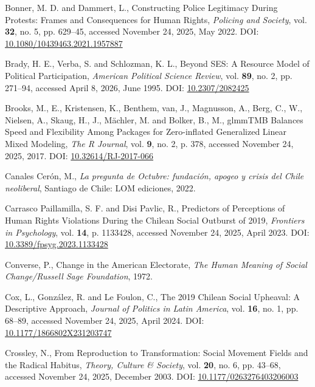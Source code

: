 \documentclass[
  13pt,
]{article}
\newlength{\cslhangindent}
\newenvironment{CSLReferences}[2] %
 {\begin{list}{}{%
  \setlength{\itemindent}{0pt}
  \setlength{\leftmargin}{0pt}
  \setlength{\parsep}{0pt}
  \ifodd #1
   \setlength{\leftmargin}{\cslhangindent}
   \setlength{\itemindent}{-1\cslhangindent}
  \fi
  \setlength{\itemsep}{#2\baselineskip}}}
 {\end{list}}
\begin{document}
\begin{CSLReferences}{1}{0}
Bonner, M. D. and Dammert, L., Constructing Police Legitimacy During
Protests: Frames and Consequences for Human Rights, \emph{Policing and
Society}, vol. \textbf{32}, no. 5, pp. 629--45, accessed November 24,
2025, May 2022. DOI:
\href{https://doi.org/10.1080/10439463.2021.1957887}{10.1080/10439463.2021.1957887}

Brady, H. E., Verba, S. and Schlozman, K. L., Beyond {SES}: {A Resource
Model} of {Political Participation}, \emph{American Political Science
Review}, vol. \textbf{89}, no. 2, pp. 271--94, accessed April 8, 2026,
June 1995. DOI: \href{https://doi.org/10.2307/2082425}{10.2307/2082425}

{Brooks, M., E., Kristensen, K., Benthem, van, J., Magnusson, A., Berg,
C., W., Nielsen, A., Skaug, H., J., Mächler, M. and Bolker, B., M.},
{glmmTMB Balances Speed} and {Flexibility Among Packages} for
{Zero-inflated Generalized Linear Mixed Modeling}, \emph{The R Journal},
vol. \textbf{9}, no. 2, p. 378, accessed November 24, 2025, 2017. DOI:
\href{https://doi.org/10.32614/RJ-2017-066}{10.32614/RJ-2017-066}

Canales Cerón, M., \emph{{La pregunta de Octubre: fundación, apogeo y
crisis del Chile neoliberal}}, Santiago de Chile: LOM ediciones, 2022.

Carrasco Paillamilla, S. F. and Disi Pavlic, R., Predictors of
Perceptions of Human Rights Violations During the {Chilean} Social
Outburst of 2019, \emph{Frontiers in Psychology}, vol. \textbf{14}, p.
1133428, accessed November 24, 2025, April 2023. DOI:
\href{https://doi.org/10.3389/fpsyg.2023.1133428}{10.3389/fpsyg.2023.1133428}

Converse, P., Change in the {American} Electorate, \emph{The Human
Meaning of Social Change/Russell Sage Foundation}, 1972.

Cox, L., González, R. and Le Foulon, C., The 2019 {Chilean Social
Upheaval}: {A Descriptive Approach}, \emph{Journal of Politics in Latin
America}, vol. \textbf{16}, no. 1, pp. 68--89, accessed November 24,
2025, April 2024. DOI:
\href{https://doi.org/10.1177/1866802X231203747}{10.1177/1866802X231203747}

Crossley, N., From {Reproduction} to {Transformation}: {Social Movement
Fields} and the {Radical Habitus}, \emph{Theory, Culture \& Society},
vol. \textbf{20}, no. 6, pp. 43--68, accessed November 24, 2025,
December 2003. DOI:
\href{https://doi.org/10.1177/0263276403206003}{10.1177/0263276403206003}


\end{CSLReferences}
\end{document}
